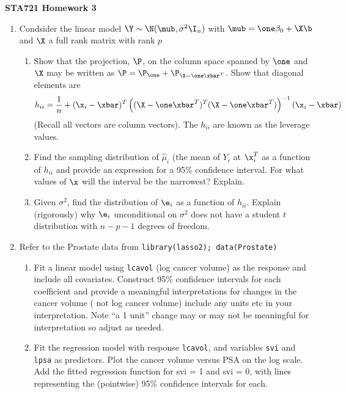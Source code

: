 \documentclass[12pt]{article}
\begin{document}
{\bf STA721 \hfill Homework 3}

\vspace{.5in}


\begin{enumerate}
\item Condsider the linear model $\Y \sim \N(\mub, \sigma^2 \I_n)$
  with  $\mub = \one \beta_0 + \X \b$ and $\X$ a full rank matrix with rank $p$
  \begin{enumerate}
  \item 

    Show that the projection, $\P$, on the column space spanned by
    $\one$ and $\X$ may be written as
    $\P = \P_{\one} + \P_{\X - \one \xbar^T}$.  Show that diagonal
    elements are
    $$h_{ii} = \frac{1}{n} + (\x_i-\xbar)^T\left((\X- \one \xbar^T)^T(\X - \one
    \xbar^T)\right)^{-1}(\x_i - \xbar)$$
    (Recall all vectors are column vectors).  The $h_{ii}$ are known
    as the leverage values.
\item Find the sampling distribution of $\hat{\mu}_i$ (the mean
  of  $Y_i$ at $\x_i^T$ as a function of $h_{ii}$ and provide an
  expression for a 95\% confidence interval.   For what values of $\x$
  will the interval be the narrowest? Explain.

\item Given $\sigma^2$, find the distribution of $\e_i$ as a function
  of $h_{ii}$.  Explain (rigorously) why $\e_i$ unconditional on
    $\sigma^2$ does not have a student $t$ distribution with
    $n - p - 1$ degrees of freedom.
\end{enumerate}
\item  Refer to the Prostate data  from {\tt library(lasso2); data(Prostate)}
\begin{enumerate}

\item Fit a linear model using {\tt lcavol} (log
  cancer volume) as the response and include all covariates.
  Construct 95\% confidence intervals for 
  each coefficient and provide a meaningful interpretations for
  changes in the  cancer volume  ( not log cancer volume) include any
  units etc in your interpretation.  Note ``a 1 unit'' change may or may not be
  meaningful for interpretation so adjust as needed.
\item Fit the regression model with
  response {\tt lcavol}, and variables {\tt svi} and {\tt lpsa} as
  predictors.  Plot the cancer volume versus PSA on the log scale. Add
  the fitted regression function for svi = 1 and svi = 0, with
  lines representing the (pointwise) 95\%  confidence intervals for
  each.
\end{enumerate}

\end{enumerate}
\end{document}
